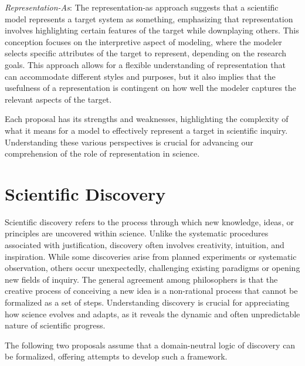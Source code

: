 \emph{Representation-As}: The representation-as approach suggests that a scientific model represents a target system as something, emphasizing that representation involves highlighting certain features of the target while downplaying others. This conception focuses on the interpretive aspect of modeling, where the modeler selects specific attributes of the target to represent, depending on the research goals. This approach allows for a flexible understanding of representation that can accommodate different styles and purposes, but it also implies that the usefulness of a representation is contingent on how well the modeler captures the relevant aspects of the target.

Each proposal has its strengths and weaknesses, highlighting the complexity of what it means for a model to effectively represent a target in scientific inquiry. Understanding these various perspectives is crucial for advancing our comprehension of the role of representation in science.

%
%

\section{Scientific Discovery}

Scientific discovery refers to the process through which new knowledge, ideas, or principles are uncovered within science. Unlike the systematic procedures associated with justification, discovery often involves creativity, intuition, and inspiration. While some discoveries arise from planned experiments or systematic observation, others occur unexpectedly, challenging existing paradigms or opening new fields of inquiry. The general agreement among philosophers is that the creative process of conceiving a new idea is a non-rational process that cannot be formalized as a set of steps. Understanding discovery is crucial for appreciating how science evolves and adapts, as it reveals the dynamic and often unpredictable nature of scientific progress.

The following two proposals assume that a domain-neutral logic of discovery can be formalized, offering attempts to develop such a framework.

